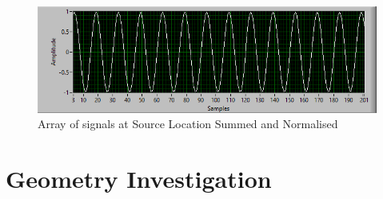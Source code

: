 \documentclass{UoNMCHA}
\numberwithin{equation}{section}
\begin{document}
    \begin{figure}[H]
        \centering
        \includegraphics[keepaspectratio, width = \textwidth]{Figures/SimSignalLocationSum.png}
        \caption{Array of signals at Source Location Summed and Normalised}
    \end{figure}

\section{Geometry Investigation} \label{app:Geom Invest}
\end{document}
